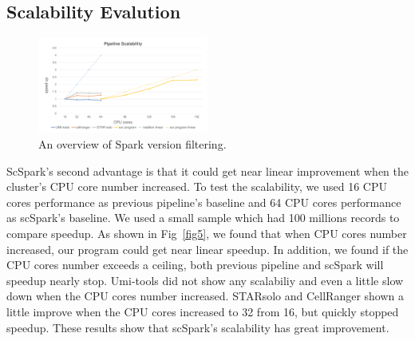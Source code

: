 \documentclass[conference]{IEEEtran}
\begin{document}
\subsection{Scalability Evalution}
\begin{figure}
  \includegraphics[width=0.5\textwidth]{fig4.pdf}
  \caption{An overview of Spark version filtering.} \label{fig4}
\end{figure}
ScSpark's second advantage is that it could get near linear improvement when the cluster's CPU core number increased. 
To test the scalability, we used 16 CPU cores performance as previous pipeline's baseline and 64 CPU cores performance as scSpark's baseline. 
We used a small sample which had 100 millions records to compare speedup. 
As shown in Fig~\ref{fig5}, we found that when CPU cores number increased, our program could get near linear speedup. 
In addition, we found if the CPU cores number exceeds a ceiling, both previous pipeline and scSpark will speedup nearly stop. 
Umi-tools did not show any scalabiliy and even a little slow down when the CPU cores number increased. 
STARsolo and CellRanger shown a little improve when the CPU cores increased to 32 from 16, but quickly stopped speedup. 
These results show that scSpark's scalability has great improvement. 
\end{document}
